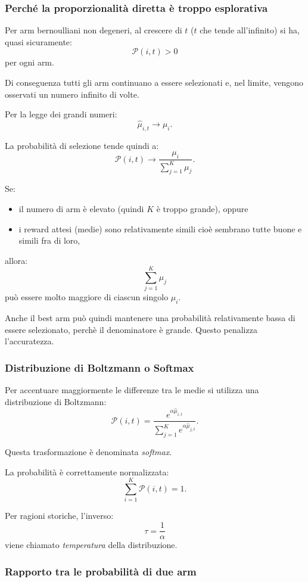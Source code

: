 \newpage
\subsubsection{Perché la proporzionalità diretta è troppo esplorativa}

Per arm bernoulliani non degeneri, al crescere di $t$ ($t$ che tende all'infinito) si ha, quasi sicuramente:
\[
\mathcal{P}(i,t)>0
\]
per ogni arm.

Di conseguenza tutti gli arm continuano a essere selezionati e, nel limite, vengono osservati un numero infinito di volte.

Per la legge dei grandi numeri:
\[
\widehat{\mu}_{i,t}\rightarrow\mu_i.
\]

La probabilità di selezione tende quindi a:
\[
\mathcal{P}(i,t)
\longrightarrow
\frac{
\mu_i
}{
\sum_{j=1}^{K}\mu_j
}.
\]

Se:
\begin{itemize}
    \item il numero di arm è elevato (quindi $K$ è troppo grande), oppure
    \item i reward attesi (medie) sono relativamente simili cioè sembrano tutte buone e simili fra di loro,
\end{itemize}
allora:
\[
\sum_{j=1}^{K}\mu_j
\]
può essere molto maggiore di ciascun singolo $\mu_i$.

Anche il best arm può quindi mantenere una probabilità relativamente bassa di essere selezionato, perchè il denominatore è grande. Questo penalizza l'accuratezza.

\subsubsection{Distribuzione di Boltzmann o Softmax}

Per accentuare maggiormente le differenze tra le medie si utilizza una distribuzione di Boltzmann:
\[
\mathcal{P}(i,t)
=
\frac{
e^{\alpha\widehat{\mu}_{i,t}}
}{
\sum_{j=1}^{K}
e^{\alpha\widehat{\mu}_{j,t}}
}.
\]

Questa trasformazione è denominata \emph{softmax}.

La probabilità è correttamente normalizzata:
\[
\sum_{i=1}^{K}\mathcal{P}(i,t)=1.
\]

Per ragioni storiche, l'inverso:
\[
\tau=\frac{1}{\alpha}
\]
viene chiamato \emph{temperatura} della distribuzione.

\subsubsection{Rapporto tra le probabilità di due arm}

